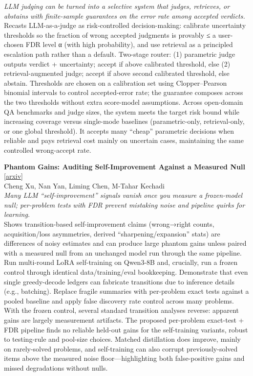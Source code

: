 \documentclass[12pt,letterpaper]{article}
\begin{document}
{\small\textit{LLM judging can be turned into a selective system that judges, retrieves, or abstains with finite-sample guarantees on the error rate among accepted verdicts.}}\\[1pt]
{\footnotesize Recasts LLM-as-a-judge as risk-controlled decision-making: calibrate uncertainty thresholds so the fraction of wrong accepted judgments is provably ≤ a user-chosen FDR level α (with high probability), and use retrieval as a principled escalation path rather than a default. Two-stage router: (1) parametric judge outputs verdict + uncertainty; accept if above calibrated threshold, else (2) retrieval-augmented judge; accept if above second calibrated threshold, else abstain. Thresholds are chosen on a calibration set using Clopper--Pearson binomial intervals to control accepted-error rate; the guarantee composes across the two thresholds without extra score-model assumptions. Across open-domain QA benchmarks and judge sizes, the system meets the target risk bound while increasing coverage versus single-mode baselines (parametric-only, retrieval-only, or one global threshold). It accepts many ``cheap'' parametric decisions when reliable and pays retrieval cost mainly on uncertain cases, maintaining the same controlled wrong-accept rate.}

\medskip

{\small\textbf{Phantom Gains: Auditing Self-Improvement Against a Measured Null}} {\scriptsize[\href{https://arxiv.org/abs/2608.20290}{arxiv}]}\\
{\scriptsize Cheng Xu, Nan Yan, Liming Chen, M-Tahar Kechadi}\\

{\small\textit{Many LLM ``self-improvement'' signals vanish once you measure a frozen-model null; per-problem tests with FDR prevent mistaking noise and pipeline quirks for learning.}}\\[1pt]
{\footnotesize Shows transition-based self-improvement claims (wrong→right counts, acquisition/loss asymmetries, derived ``sharpening/expansion'' stats) are differences of noisy estimates and can produce large phantom gains unless paired with a measured null from an unchanged model run through the same pipeline. Run multi-round LoRA self-training on Qwen3-8B and, crucially, run a frozen control through identical data/training/eval bookkeeping. Demonstrate that even single greedy-decode ledgers can fabricate transitions due to inference details (e.g., batching). Replace fragile summaries with per-problem exact tests against a pooled baseline and apply false discovery rate control across many problems. With the frozen control, several standard transition analyses reverse: apparent gains are largely measurement artifacts. The proposed per-problem exact-test + FDR pipeline finds no reliable held-out gains for the self-training variants, robust to testing-rule and pool-size choices. Matched distillation does improve, mainly on rarely-solved problems, and self-training can also corrupt previously-solved items above the measured noise floor---highlighting both false-positive gains and missed degradations without nulls.}
\end{document}
